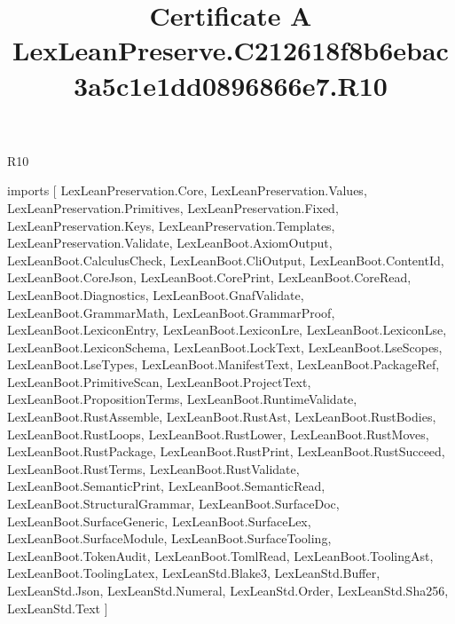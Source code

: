 \begin{lexlean}{R10}
\title{Certificate A LexLeanPreserve.C212618f8b6ebac3a5c1e1dd0896866e7.R10}
\begin{coremodule}
imports [
  LexLeanPreservation.Core,
  LexLeanPreservation.Values,
  LexLeanPreservation.Primitives,
  LexLeanPreservation.Fixed,
  LexLeanPreservation.Keys,
  LexLeanPreservation.Templates,
  LexLeanPreservation.Validate,
  LexLeanBoot.AxiomOutput,
  LexLeanBoot.CalculusCheck,
  LexLeanBoot.CliOutput,
  LexLeanBoot.ContentId,
  LexLeanBoot.CoreJson,
  LexLeanBoot.CorePrint,
  LexLeanBoot.CoreRead,
  LexLeanBoot.Diagnostics,
  LexLeanBoot.GnafValidate,
  LexLeanBoot.GrammarMath,
  LexLeanBoot.GrammarProof,
  LexLeanBoot.LexiconEntry,
  LexLeanBoot.LexiconLre,
  LexLeanBoot.LexiconLse,
  LexLeanBoot.LexiconSchema,
  LexLeanBoot.LockText,
  LexLeanBoot.LseScopes,
  LexLeanBoot.LseTypes,
  LexLeanBoot.ManifestText,
  LexLeanBoot.PackageRef,
  LexLeanBoot.PrimitiveScan,
  LexLeanBoot.ProjectText,
  LexLeanBoot.PropositionTerms,
  LexLeanBoot.RuntimeValidate,
  LexLeanBoot.RustAssemble,
  LexLeanBoot.RustAst,
  LexLeanBoot.RustBodies,
  LexLeanBoot.RustLoops,
  LexLeanBoot.RustLower,
  LexLeanBoot.RustMoves,
  LexLeanBoot.RustPackage,
  LexLeanBoot.RustPrint,
  LexLeanBoot.RustSucceed,
  LexLeanBoot.RustTerms,
  LexLeanBoot.RustValidate,
  LexLeanBoot.SemanticPrint,
  LexLeanBoot.SemanticRead,
  LexLeanBoot.StructuralGrammar,
  LexLeanBoot.SurfaceDoc,
  LexLeanBoot.SurfaceGeneric,
  LexLeanBoot.SurfaceLex,
  LexLeanBoot.SurfaceModule,
  LexLeanBoot.SurfaceTooling,
  LexLeanBoot.TokenAudit,
  LexLeanBoot.TomlRead,
  LexLeanBoot.ToolingAst,
  LexLeanBoot.ToolingLatex,
  LexLeanStd.Blake3,
  LexLeanStd.Buffer,
  LexLeanStd.Json,
  LexLeanStd.Numeral,
  LexLeanStd.Order,
  LexLeanStd.Sha256,
  LexLeanStd.Text
]


\end{coremodule}
\end{lexlean}
